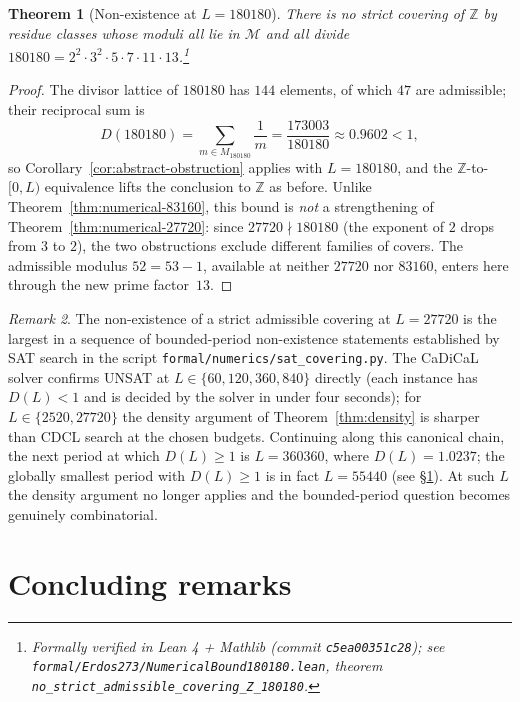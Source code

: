 \documentclass[11pt,a4paper]{article}
\theoremstyle{plain}
\newtheorem{theorem}{Theorem}
\theoremstyle{definition}
\theoremstyle{remark}
\newtheorem{remark}[theorem]{Remark}
\begin{document}
\begin{theorem}[{Non-existence at $L = 180180$}]
\label{thm:numerical-180180}
There is no strict covering of\/ $\mathbb{Z}$ by residue classes
whose moduli all lie in $\mathcal{M}$ and all divide $180180 = 2^2
\cdot 3^2 \cdot 5 \cdot 7 \cdot 11 \cdot 13$.\footnote{Formally
verified in Lean 4 + Mathlib (commit \texttt{c5ea00351c28}); see
\texttt{formal/Erdos273/NumericalBound180180.lean}, theorem
\texttt{no\_strict\_admissible\_covering\_Z\_180180}.}
\end{theorem}
\begin{proof}
The divisor lattice of $180180$ has $144$ elements, of which $47$ are
admissible; their reciprocal sum is
\[
  D(180180) = \sum_{m \in M_{180180}} \frac{1}{m} = \frac{173003}{180180}
  \approx 0.9602 < 1,
\]
so Corollary~\ref{cor:abstract-obstruction} applies with $L = 180180$,
and the $\mathbb{Z}$-to-$[0, L)$ equivalence lifts the conclusion to
$\mathbb{Z}$ as before. Unlike
Theorem~\ref{thm:numerical-83160}, this bound is \emph{not} a
strengthening of Theorem~\ref{thm:numerical-27720}: since $27720 \nmid
180180$ (the exponent of $2$ drops from $3$ to $2$), the two
obstructions exclude different families of covers. The admissible
modulus $52 = 53 - 1$, available at neither $27720$ nor $83160$,
enters here through the new prime factor~$13$.
\end{proof}

\begin{remark}\label{rem:sat-evidence}
The non-existence of a strict admissible covering at $L = 27720$ is
the largest in a sequence of bounded-period non-existence statements
established by SAT search in the script
\texttt{formal/numerics/sat\_covering.py}. The CaDiCaL solver
\cite{Biere2024CaDiCaL} confirms UNSAT at $L \in \{60, 120, 360,
840\}$ directly (each instance has $D(L) < 1$ and is decided by the
solver in under four seconds); for $L \in \{2520, 27720\}$ the
density argument of Theorem~\ref{thm:density} is sharper than CDCL
search at the chosen budgets. Continuing along this canonical chain,
the next period at which $D(L) \geq 1$ is $L = 360360$, where $D(L)
= 1.0237$; the globally smallest period with $D(L) \geq 1$ is in
fact $L = 55440$ (see \S\ref{sec:concluding}). At such $L$ the
density argument no longer applies and the bounded-period question
becomes genuinely combinatorial.
\end{remark}

\section{Concluding remarks}
\label{sec:concluding}
\end{document}
